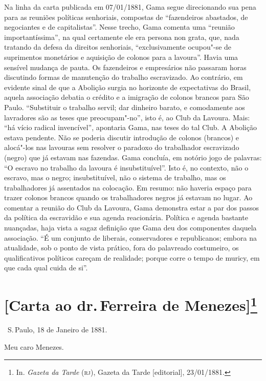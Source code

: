 {\small\noindent
Na linha da carta publicada em 07/01/1881, Gama segue direcionando
sua pena para as reuniões políticas senhoriais, compostas de
``fazendeiros abastados, de negociantes e de capitalistas''. Nesse trecho,
Gama comenta uma ``reunião importantíssima'', na qual certamente ele era
persona non grata, que, nada tratando da defesa da direitos senhoriais,
``exclusivamente ocupou"-se de suprimentos monetários e aquisição de
colonos para a lavoura''. Havia uma sensível mudança de pauta. Os
fazendeiros e empresários não passaram horas discutindo formas de
manutenção do trabalho escravizado. Ao contrário, em evidente sinal de
que a Abolição surgia no horizonte de expectativas do Brasil, aquela
associação debatia o crédito e
a imigração de colonos brancos para São Paulo. ``Substituir o trabalho
servil; dar dinheiro barato, e comodamente aos lavradores são as teses
que preocupam"-no'', isto é, ao Club da Lavoura. Mais: ``há vício radical
invencível'', apontaria Gama, nas teses do tal Club. A Abolição estava
pendente. Não se poderia discutir introdução de colonos (brancos) e
alocá"-los nas lavouras sem resolver o paradoxo do trabalhador
escravizado (negro) que já estavam nas fazendas. Gama concluía, em
notório jogo de palavras: ``O escravo no trabalho da lavoura é insubstituível''. Isto é, no
contexto, não o escravo, mas o negro; insubstituível, não o sistema de
trabalho, mas os trabalhadores já assentados na colocação. Em resumo:
não haveria espaço para trazer colonos brancos quando os trabalhadores
negros já estavam no lugar. Ao comentar a reunião do Club da Lavoura,
Gama demonstra estar a par dos passos da política da escravidão e sua
agenda reacionária. Política e agenda bastante nuançadas, haja vista a
sagaz definição que Gama deu dos componentes daquela associação. ``É um
conjunto de liberais, conservadores e republicanos; embora na
atualidade, sob o ponto de vista prático, fora do palavreado costumeiro,
os qualificativos políticos careçam de realidade; porque corre o tempo
de muricy, em que cada qual cuida de si''.}

\chapter{{[}Carta ao dr.\,Ferreira de Menezes{]}\footnote[*]{In.
  \emph{Gazeta da Tarde} (\textsc{rj}), Gazeta da Tarde {[}editorial{]},
  23/01/1881.}}

\hfill\ S.\,Paulo, 18 de Janeiro de 1881.\bigskip

\noindent{}Meu caro Menezes.\smallskip

